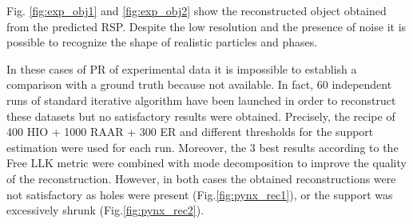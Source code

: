 Fig. \ref{fig:exp_obj1} and \ref{fig:exp_obj2} show the reconstructed object obtained from the predicted RSP. Despite the 
low resolution and the presence of noise it is possible to recognize the shape of realistic particles and phases.

In these cases of PR of experimental data it is impossible to establish a comparison with a ground truth because not available.
In fact, 60 independent runs of standard iterative algorithm have been launched in order to reconstruct these datasets but no satisfactory results 
were obtained. Precisely, the recipe of 400 HIO + 1000 RAAR + 300 ER and different thresholds for the support estimation
were used for each run. Moreover, the 3 best results according to the Free LLK metric \cite{favre-nicolin_free_2020} were 
combined with mode decomposition to improve the quality of the reconstruction. However, in both cases the obtained reconstructions 
were not satisfactory as holes were present (Fig.\ref{fig:pynx_rec1}), or the support was excessively shrunk (Fig.\ref{fig:pynx_rec2}).\\

